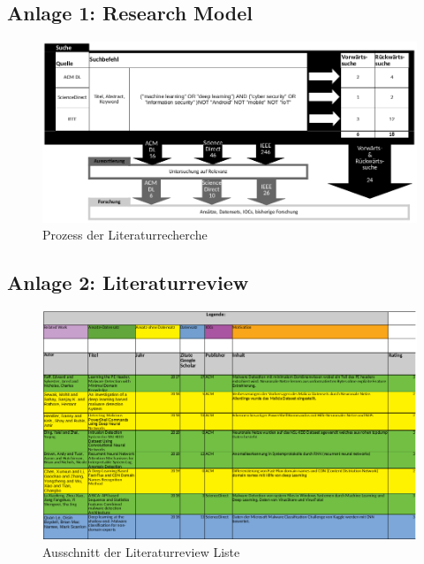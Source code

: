 \documentclass[
    12pt, %
    DIV10,
    ngerman, %
    a4paper, %
    oneside, %
    titlepage, %
    parskip=half, %
    headings=normal, %
    listof=totoc, %
    bibliography=totoc, %
    index=totoc, %
    captions=tableheading, %
    final %
]{scrreprt}
\begin{document}
\subsection*{Anlage 1: Research Model}\label{rm}

\begin{figure}[h!]
\hspace{-2.3cm}
\includegraphics[width=1.3\textwidth]{img/rm}
\caption*{Prozess der Literaturrecherche}
\end{figure}
\subsection*{Anlage 2: Literaturreview}\label{literaturr}

\begin{figure}[h!]
\hspace{-2.2cm}
\includegraphics[width=1.3\textwidth]{img/literaturr}
\caption*{Ausschnitt der Literaturreview Liste}
\end{figure}
\end{document}
